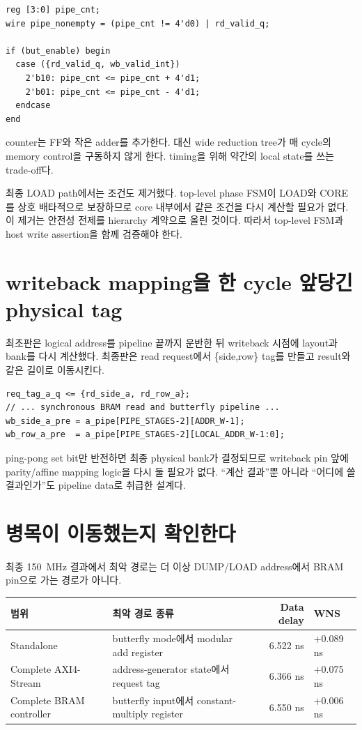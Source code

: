 \begin{lstlisting}
reg [3:0] pipe_cnt;
wire pipe_nonempty = (pipe_cnt != 4'd0) | rd_valid_q;

if (but_enable) begin
  case ({rd_valid_q, wb_valid_int})
    2'b10: pipe_cnt <= pipe_cnt + 4'd1;
    2'b01: pipe_cnt <= pipe_cnt - 4'd1;
  endcase
end
\end{lstlisting}

counter는 FF와 작은 adder를 추가한다. 대신 wide reduction tree가 매 cycle의
memory control을 구동하지 않게 한다. timing을 위해 약간의 local state를 쓰는
trade-off다.

최종 LOAD path에서는  조건도 제거했다. top-level phase FSM이
LOAD와 CORE를 상호 배타적으로 보장하므로 core 내부에서 같은 조건을 다시
계산할 필요가 없다. 이 제거는 안전성 전제를 hierarchy 계약으로 올린 것이다.
따라서 top-level FSM과 host write assertion을 함께 검증해야 한다.

\section{writeback mapping을 한 cycle 앞당긴 physical tag}

최초판은 logical address를 pipeline 끝까지 운반한 뒤 writeback 시점에 layout과
bank를 다시 계산했다. 최종판은 read request에서 \{side,row\} tag를 만들고
result와 같은 길이로 이동시킨다.

\begin{lstlisting}
req_tag_a_q <= {rd_side_a, rd_row_a};
// ... synchronous BRAM read and butterfly pipeline ...
wb_side_a_pre = a_pipe[PIPE_STAGES-2][ADDR_W-1];
wb_row_a_pre  = a_pipe[PIPE_STAGES-2][LOCAL_ADDR_W-1:0];
\end{lstlisting}

ping-pong set bit만 반전하면 최종 physical bank가 결정되므로 writeback pin 앞에
parity/affine mapping logic을 다시 둘 필요가 없다. ``계산 결과''뿐 아니라
``어디에 쓸 결과인가''도 pipeline data로 취급한 설계다.

\section{병목이 이동했는지 확인한다}

최종 150~MHz 결과에서 최악 경로는 더 이상 DUMP/LOAD address에서 BRAM pin으로
가는 경로가 아니다.

\begin{longtable}{L{42mm}L{49mm}rL{47mm}}
\toprule
범위 & 최악 경로 종류 & Data delay & WNS \\
\midrule
Standalone  & butterfly mode에서 modular add register & 6.522 ns & +0.089 ns \\
Complete AXI4-Stream & address-generator state에서 request tag & 6.366 ns & +0.075 ns \\
Complete BRAM controller & butterfly input에서 constant-multiply register & 6.550 ns & +0.006 ns \\
\bottomrule
\end{longtable}

